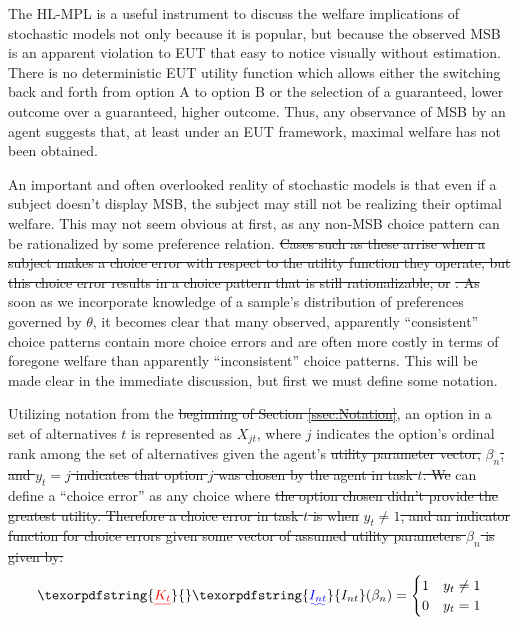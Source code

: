 \documentclass[11pt,a4paper]{article} %
\providecommand{\DIFaddtex}[1]{{\protect\color{blue}\uwave{#1}}} %
\providecommand{\DIFdeltex}[1]{{\protect\color{red}\sout{#1}}}                      %
\providecommand{\DIFaddbegin}{} %
\providecommand{\DIFaddend}{} %
\providecommand{\DIFdelbegin}{} %
\providecommand{\DIFdelend}{} %
\providecommand{\DIFadd}[1]{\texorpdfstring{\DIFaddtex{#1}}{#1}} %
\providecommand{\DIFdel}[1]{\texorpdfstring{\DIFdeltex{#1}}{}} %
\newcommand{\DIFscaledelfig}{0.5}
\newlength{\DIFdelgraphicswidth} %
\newlength{\DIFdelgraphicsheight} %
\newcommand{\DIFaddincludegraphics}[2][]{{\color{blue}\fbox{\DIFOincludegraphics[#1]{#2}}}} %
\newcommand{\DIFdelincludegraphics}[2][]{%
\sbox{\DIFdelgraphicsbox}{\DIFOincludegraphics[#1]{#2}}%
\settoboxwidth{\DIFdelgraphicswidth}{\DIFdelgraphicsbox} %
\settoboxtotalheight{\DIFdelgraphicsheight}{\DIFdelgraphicsbox} %
\scalebox{\DIFscaledelfig}{%
\parbox[b]{\DIFdelgraphicswidth}{\usebox{\DIFdelgraphicsbox}\\[-\baselineskip] \rule{\DIFdelgraphicswidth}{0em}}\llap{\resizebox{\DIFdelgraphicswidth}{\DIFdelgraphicsheight}{%
\setlength{\unitlength}{\DIFdelgraphicswidth}%
\begin{picture}(1,1)%
\thicklines\linethickness{2pt} %
{\color[rgb]{1,0,0}\put(0,0){\framebox(1,1){}}}%
{\color[rgb]{1,0,0}\put(0,0){\line( 1,1){1}}}%
{\color[rgb]{1,0,0}\put(0,1){\line(1,-1){1}}}%
\end{picture}%
}\hspace*{3pt}}} %
} %
\DeclareRobustCommand{\DIFaddbegin}{\DIFOaddbegin \let\includegraphics\DIFaddincludegraphics} %
\DeclareRobustCommand{\DIFaddend}{\DIFOaddend \let\includegraphics\DIFOincludegraphics} %
\DeclareRobustCommand{\DIFdelbegin}{\DIFOdelbegin \let\includegraphics\DIFdelincludegraphics} %
\DeclareRobustCommand{\DIFdelend}{\DIFOaddend \let\includegraphics\DIFOincludegraphics} %
\begin{document}
The HL-MPL is a useful instrument to discuss the welfare implications of stochastic models not only because it is popular, but because the \DIFaddbegin \DIFadd{frequently }\DIFaddend observed MSB is an apparent violation to EUT that easy to notice visually without estimation.
There is no deterministic EUT utility function which allows either the switching back and forth from option A to option B or the selection of a guaranteed, lower outcome over a guaranteed, higher outcome.
Thus, any observance of MSB by an agent suggests that, at least under an EUT framework, maximal welfare has not been obtained.

An important and often overlooked reality of stochastic models is that even if a subject doesn't display MSB, the subject may still not be realizing their optimal welfare.
This may not seem obvious at first, as any non-MSB choice pattern can be rationalized by some preference relation.
\DIFdelbegin \DIFdel{Cases such as these arrise when a subject makes a choice error with respect to the utility function they operate, but this choice error results in a choice pattern that is still rationalizable, or }%
\DIFdel{.
As }\DIFdelend \DIFaddbegin \DIFadd{But as }\DIFaddend soon as we incorporate knowledge of a sample's distribution of preferences governed by $\theta$, it becomes clear that many observed, apparently \enquote{consistent} choice patterns contain more choice errors and are often more costly in terms of foregone welfare than apparently \enquote{inconsistent} choice patterns.
This will be made clear in the immediate discussion, but first we must define some notation.

Utilizing notation from the \DIFdelbegin \DIFdel{beginning of Section \ref{ssec:Notation}}\DIFdelend \DIFaddbegin \DIFadd{previous chapter}\DIFaddend , an option in a set of alternatives $t$ is represented as $X_{jt}$, where $j$ indicates the option's ordinal rank among the set of alternatives given the agent's \DIFdelbegin \DIFdel{utility parameter vector, }\DIFdelend $\beta_n$\DIFdelbegin \DIFdel{, and $y_t = j$ indicates that option $j$ was chosen by the agent in task $t$.
We }\DIFdelend \DIFaddbegin \DIFadd{.
Therefore, we }\DIFaddend can define a \enquote{choice error} as any choice where \DIFdelbegin \DIFdel{the option chosen didn't provide the greatest utility.
Therefore a choice error in task $t$ is when }\DIFdelend $y_t \neq 1$\DIFdelbegin \DIFdel{, and an indicator function for choice errors given some vector of assumed utility parameters $\beta_n$ is given by:
}\DIFdelend \DIFaddbegin \DIFadd{:
}\DIFaddend \begin{equation}
	\DIFdelbegin %
\DIFdel{K_{t}}\DIFdelend \DIFaddbegin \DIFadd{I_{nt}}\DIFaddend (\beta_n) = 
	\begin{cases}
		 1 & y_t \neq 1\\
		 0 & y_t = 1
	\end{cases}
\end{equation}
\end{document}
